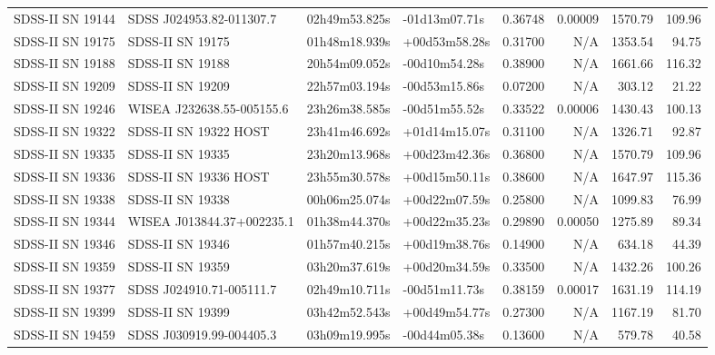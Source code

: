 \begin{longtable}{llllrrrr}
SDSS-II SN 19144 &        SDSS J024953.82-011307.7 &   02h49m53.825s &   -01d13m07.71s &  0.36748 &  0.00009 &  1570.79 &      109.96 \\
SDSS-II SN 19175 &                SDSS-II SN 19175 &   01h48m18.939s &   +00d53m58.28s &  0.31700 &      N/A &  1353.54 &       94.75 \\
SDSS-II SN 19188 &                SDSS-II SN 19188 &   20h54m09.052s &   -00d10m54.28s &  0.38900 &      N/A &  1661.66 &      116.32 \\
SDSS-II SN 19209 &                SDSS-II SN 19209 &   22h57m03.194s &   -00d53m15.86s &  0.07200 &      N/A &   303.12 &       21.22 \\
SDSS-II SN 19246 &       WISEA J232638.55-005155.6 &   23h26m38.585s &   -00d51m55.52s &  0.33522 &  0.00006 &  1430.43 &      100.13 \\
SDSS-II SN 19322 &           SDSS-II SN 19322 HOST &   23h41m46.692s &   +01d14m15.07s &  0.31100 &      N/A &  1326.71 &       92.87 \\
SDSS-II SN 19335 &                SDSS-II SN 19335 &   23h20m13.968s &   +00d23m42.36s &  0.36800 &      N/A &  1570.79 &      109.96 \\
SDSS-II SN 19336 &           SDSS-II SN 19336 HOST &   23h55m30.578s &   +00d15m50.11s &  0.38600 &      N/A &  1647.97 &      115.36 \\
SDSS-II SN 19338 &                SDSS-II SN 19338 &   00h06m25.074s &   +00d22m07.59s &  0.25800 &      N/A &  1099.83 &       76.99 \\
SDSS-II SN 19344 &       WISEA J013844.37+002235.1 &   01h38m44.370s &   +00d22m35.23s &  0.29890 &  0.00050 &  1275.89 &       89.34 \\
SDSS-II SN 19346 &                SDSS-II SN 19346 &   01h57m40.215s &   +00d19m38.76s &  0.14900 &      N/A &   634.18 &       44.39 \\
SDSS-II SN 19359 &                SDSS-II SN 19359 &   03h20m37.619s &   +00d20m34.59s &  0.33500 &      N/A &  1432.26 &      100.26 \\
SDSS-II SN 19377 &        SDSS J024910.71-005111.7 &   02h49m10.711s &   -00d51m11.73s &  0.38159 &  0.00017 &  1631.19 &      114.19 \\
SDSS-II SN 19399 &                SDSS-II SN 19399 &   03h42m52.543s &   +00d49m54.77s &  0.27300 &      N/A &  1167.19 &       81.70 \\
SDSS-II SN 19459 &        SDSS J030919.99-004405.3 &   03h09m19.995s &   -00d44m05.38s &  0.13600 &      N/A &   579.78 &       40.58 \\

\end{longtable}
